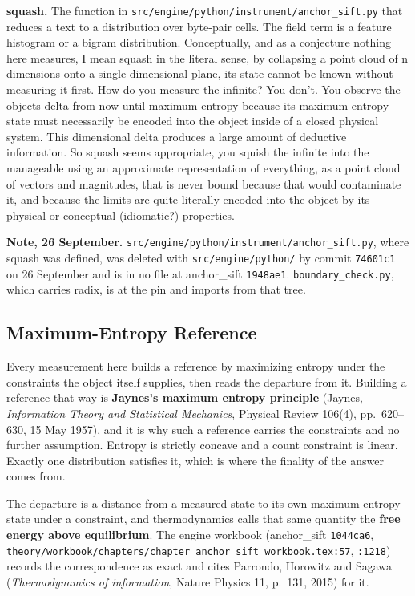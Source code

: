 \noindent\textbf{squash.} The function in \texttt{src/\allowbreak{}engine/\allowbreak{}python/\allowbreak{}instrument/\allowbreak{}anchor\_\allowbreak{}sift.\allowbreak{}py} that reduces a text to a distribution over byte-pair cells. The field term is a feature histogram or a bigram distribution. Conceptually, and as a conjecture nothing here measures, I mean squash in the literal sense, by collapsing a point cloud of n dimensions onto a single dimensional plane, its state cannot be known without measuring it first. How do you measure the infinite? You don't. You observe the objects delta from now until maximum entropy because its maximum entropy state must necessarily be encoded into the object inside of a closed physical system. This dimensional delta produces a large amount of deductive information. So squash seems appropriate, you squish the infinite into the manageable using an approximate representation of everything, as a point cloud of vectors and magnitudes, that is never bound because that would contaminate it, and because the limits are quite literally encoded into the object by its physical or conceptual (idiomatic?) properties.

\noindent\textbf{Note, 26 September.} \texttt{src/\allowbreak{}engine/\allowbreak{}python/\allowbreak{}instrument/\allowbreak{}anchor\_\allowbreak{}sift.\allowbreak{}py}, where squash was defined, was deleted with \texttt{src/\allowbreak{}engine/\allowbreak{}python/} by commit \texttt{74601c1} on 26 September and is in no file at anchor\_sift \texttt{1948ae1}. \texttt{boundary\_\allowbreak{}check.\allowbreak{}py}, which carries radix, is at the pin and imports from that tree.

\subsection{Maximum-Entropy Reference}

Every measurement here builds a reference by maximizing entropy under the constraints the object itself supplies, then reads the departure from it. Building a reference that way is \textbf{Jaynes's maximum entropy principle} (Jaynes, \emph{Information Theory and Statistical Mechanics}, Physical Review 106(4), pp.~620--630, 15 May 1957), and it is why such a reference carries the constraints and no further assumption. Entropy is strictly concave and a count constraint is linear. Exactly one distribution satisfies it, which is where the finality of the answer comes from.

The departure is a distance from a measured state to its own maximum entropy state under a constraint, and thermodynamics calls that same quantity the \textbf{free energy above equilibrium}. The engine workbook (anchor\_sift \texttt{1044ca6}, \texttt{theory/\allowbreak{}workbook/\allowbreak{}chapters/\allowbreak{}chapter\_\allowbreak{}anchor\_\allowbreak{}sift\_\allowbreak{}workbook.\allowbreak{}tex:57}, \texttt{:1218}) records the correspondence as exact and cites Parrondo, Horowitz and Sagawa (\emph{Thermodynamics of information}, Nature Physics 11, p.~131, 2015) for it.

